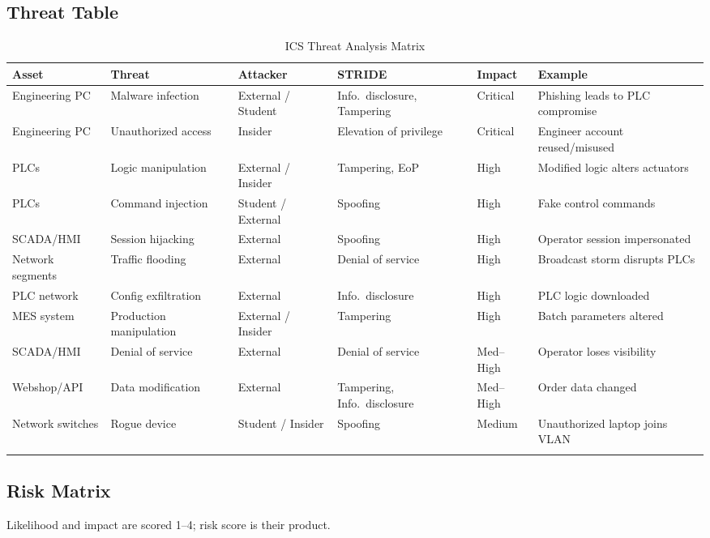 \documentclass[11pt,a4paper]{article}
\begin{document}
\subsection{Threat Table}
{\small
\setlength{\tabcolsep}{4pt}
\begin{longtable}{L{2.2cm} L{3cm} L{2.2cm} L{2.8cm} L{1.4cm} L{3.2cm}}
\toprule
\textbf{Asset} & \textbf{Threat} & \textbf{Attacker} & \textbf{STRIDE} & \textbf{Impact} & \textbf{Example} \\
\midrule \endhead
Engineering PC & Malware infection & External / Student & Info.\ disclosure, Tampering & Critical & Phishing leads to PLC compromise \\
Engineering PC & Unauthorized access & Insider & Elevation of privilege & Critical & Engineer account reused/misused \\
PLCs & Logic manipulation & External / Insider & Tampering, EoP & High & Modified logic alters actuators \\
PLCs & Command injection & Student / External & Spoofing & High & Fake control commands \\
SCADA/HMI & Session hijacking & External & Spoofing & High & Operator session impersonated \\
Network segments & Traffic flooding & External & Denial of service & High & Broadcast storm disrupts PLCs \\
PLC network & Config exfiltration & External & Info.\ disclosure & High & PLC logic downloaded \\
MES system & Production manipulation & External / Insider & Tampering & High & Batch parameters altered \\
SCADA/HMI & Denial of service & External & Denial of service & Med--High & Operator loses visibility \\
Webshop/API & Data modification & External & Tampering, Info.\ disclosure & Med--High & Order data changed \\
Network switches & Rogue device & Student / Insider & Spoofing & Medium & Unauthorized laptop joins VLAN \\
\bottomrule
\caption{ICS Threat Analysis Matrix}
\end{longtable}
}

\subsection{Risk Matrix}
Likelihood and impact are scored 1--4; risk score is their product.
\end{document}
